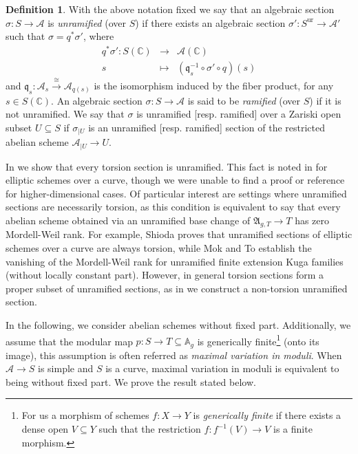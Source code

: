 \documentclass[10 pt,a4paper]{article}
\theoremstyle{plain}
\theoremstyle{definition}
\newtheorem{defn}[thm]{Definition}
\theoremstyle{named}
\DeclareMathOperator{\ur}{ur}
\newcommand{\cA}{\mathcal A}
\newcommand{\fA}{\mathfrak A}
\begin{document}
\begin{defn}\label{def:ram_sect}
    With the above notation fixed we say that an algebraic section $\sigma:S \to \cA$ is \emph{unramified} (over $S$) if there exists an algebraic  section $\sigma':S^{\ur} \to \cA'$ such that $\sigma=q^*\sigma'$, where 
\begin{eqnarray*}
q^*\sigma'\colon S(\mathbb C)& \to& \mathcal A(\mathbb C)\\
s &\mapsto&(\mathfrak q^{-1}_s\circ\sigma'\circ q)(s)
\end{eqnarray*}
and $\mathfrak q_s:\mathcal A_s\xrightarrow{\cong} \mathcal A_{q(s)}$  is the isomorphism induced by the fiber product, for any $s\in S(\mathbb C)$. 
An algebraic section $\sigma\colon S\to \cA$ is said to be \emph{ramified} (over $S$) if it is not unramified. We say that $\sigma$ is unramified [resp. ramified] over a Zariski open subset $U\subseteq S$ if $\sigma_{|U}$ is an unramified [resp. ramified] section  of the restricted abelian scheme $\mathcal A_{|U}\to U$.
\end{defn}

In   we show that every torsion section is unramified. This fact is noted in \cite{CZ} for elliptic schemes over a curve, though we were unable to find a proof or reference for higher-dimensional cases. Of particular interest are settings where unramified sections are necessarily torsion, as this condition is equivalent to say that every abelian scheme obtained via an unramified base change of $\fA_{g,T} \to T$ has zero Mordell-Weil rank. For example, Shioda \cite{Shio} proves that unramified sections of elliptic schemes over a curve are always torsion, while Mok and To \cite{MokTo} establish the vanishing of the Mordell-Weil rank for unramified finite extension Kuga families (without locally constant part). However, in general torsion sections form a proper subset of unramified sections, as in  we construct a non-torsion unramified section.

In the following, we consider abelian schemes without fixed part. Additionally, we assume that the modular map $p:S\to T\subseteq\mathbb A_g$ is generically finite\footnote{For us a morphism of schemes $f\colon X\to Y$ is \emph{generically finite} if there exists a dense open $V\subseteq Y$ such that the restriction $f\colon f^{-1}(V)\to V$ is a finite morphism.} (onto its image), this assumption is often referred as \emph{maximal variation in moduli}. When $\mathcal A \to S$ is simple and $S$ is a curve, maximal variation in moduli is equivalent to being without fixed part. We prove the result stated below.
\end{document}
